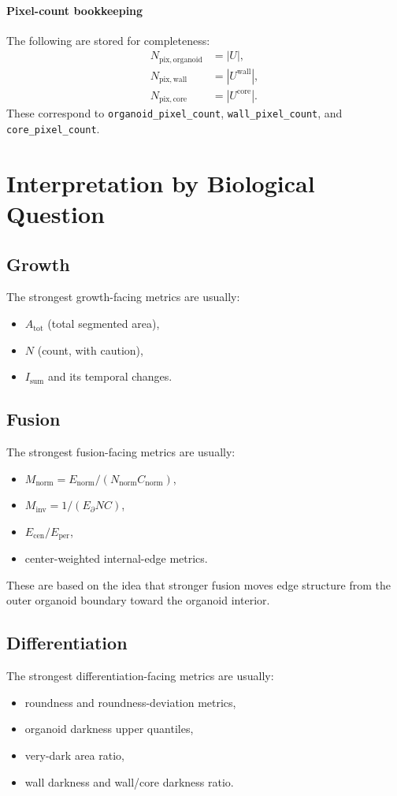 \documentclass[11pt]{article}
\newcommand{\1}{\mathbf{1}}
\newcommand{\unionmask}{U}
\begin{document}
\paragraph{Pixel-count bookkeeping}
The following are stored for completeness:
\begin{align}
N_{\mathrm{pix,organoid}} &= |\unionmask|,\\
N_{\mathrm{pix,wall}} &= |\unionmask^{\mathrm{wall}}|,\\
N_{\mathrm{pix,core}} &= |\unionmask^{\mathrm{core}}|.
\end{align}
These correspond to \texttt{organoid\_pixel\_count}, \texttt{wall\_pixel\_count}, and \texttt{core\_pixel\_count}.

\section{Interpretation by Biological Question}
\subsection{Growth}
The strongest growth-facing metrics are usually:
\begin{itemize}[leftmargin=1.5em]
  \item $A_{\mathrm{tot}}$ (total segmented area),
  \item $N$ (count, with caution),
  \item $I_{\mathrm{sum}}$ and its temporal changes.
\end{itemize}

\subsection{Fusion}
The strongest fusion-facing metrics are usually:
\begin{itemize}[leftmargin=1.5em]
  \item $M_{\mathrm{norm}} = E_{\mathrm{norm}}/(N_{\mathrm{norm}}C_{\mathrm{norm}})$,
  \item $M_{\mathrm{inv}} = 1/(E_{\partial}NC)$,
  \item $E_{\mathrm{cen}}/E_{\mathrm{per}}$,
  \item center-weighted internal-edge metrics.
\end{itemize}

These are based on the idea that stronger fusion moves edge structure from the outer organoid boundary toward the organoid interior.

\subsection{Differentiation}
The strongest differentiation-facing metrics are usually:
\begin{itemize}[leftmargin=1.5em]
  \item roundness and roundness-deviation metrics,
  \item organoid darkness upper quantiles,
  \item very-dark area ratio,
  \item wall darkness and wall/core darkness ratio.
\end{itemize}
\end{document}
